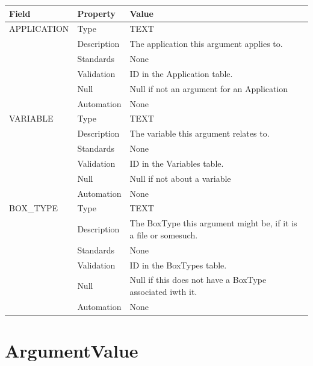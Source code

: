 \begin{longtable}[]{@{}
  >{\raggedright\arraybackslash}p{}
  >{\raggedright\arraybackslash}p{}
  >{\raggedright\arraybackslash}p{}@{}}
\toprule\noalign{}
\begin{minipage}[b]{\linewidth}\raggedright
Field
\end{minipage} & \begin{minipage}[b]{\linewidth}\raggedright
Property
\end{minipage} & \begin{minipage}[b]{\linewidth}\raggedright
Value
\end{minipage} \\
\midrule\noalign{}
\endhead
\bottomrule\noalign{}
\endlastfoot
APPLICATION & Type & TEXT \\
& Description & The application this argument applies to. \\
& Standards & None \\
& Validation & ID in the Application table. \\
& Null & Null if not an argument for an Application \\
& Automation & None \\
VARIABLE & Type & TEXT \\
& Description & The variable this argument relates to. \\
& Standards & None \\
& Validation & ID in the Variables table. \\
& Null & Null if not about a variable \\
& Automation & None \\
BOX\_TYPE & Type & TEXT \\
& Description & The BoxType this argument might be, if it is a file or
somesuch. \\
& Standards & None \\
& Validation & ID in the BoxTypes table. \\
& Null & Null if this does not have a BoxType associated iwth it. \\
& Automation & None \\
\end{longtable}

\section{ArgumentValue}\label{argumentvalue}


